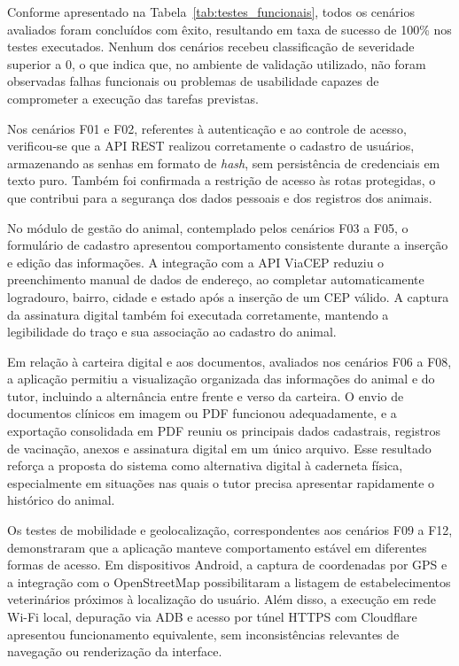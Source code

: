 Conforme apresentado na Tabela~\ref{tab:testes_funcionais}, todos os cenários avaliados foram concluídos com êxito, resultando em taxa de sucesso de 100\% nos testes executados. Nenhum dos cenários recebeu classificação de severidade superior a 0, o que indica que, no ambiente de validação utilizado, não foram observadas falhas funcionais ou problemas de usabilidade capazes de comprometer a execução das tarefas previstas.

Nos cenários F01 e F02, referentes à autenticação e ao controle de acesso, verificou-se que a API REST realizou corretamente o cadastro de usuários, armazenando as senhas em formato de \textit{hash}, sem persistência de credenciais em texto puro. Também foi confirmada a restrição de acesso às rotas protegidas, o que contribui para a segurança dos dados pessoais e dos registros dos animais.

No módulo de gestão do animal, contemplado pelos cenários F03 a F05, o formulário de cadastro apresentou comportamento consistente durante a inserção e edição das informações. A integração com a API ViaCEP reduziu o preenchimento manual de dados de endereço, ao completar automaticamente logradouro, bairro, cidade e estado após a inserção de um CEP válido. A captura da assinatura digital também foi executada corretamente, mantendo a legibilidade do traço e sua associação ao cadastro do animal.

Em relação à carteira digital e aos documentos, avaliados nos cenários F06 a F08, a aplicação permitiu a visualização organizada das informações do animal e do tutor, incluindo a alternância entre frente e verso da carteira. O envio de documentos clínicos em imagem ou PDF funcionou adequadamente, e a exportação consolidada em PDF reuniu os principais dados cadastrais, registros de vacinação, anexos e assinatura digital em um único arquivo. Esse resultado reforça a proposta do sistema como alternativa digital à caderneta física, especialmente em situações nas quais o tutor precisa apresentar rapidamente o histórico do animal.

Os testes de mobilidade e geolocalização, correspondentes aos cenários F09 a F12, demonstraram que a aplicação manteve comportamento estável em diferentes formas de acesso. Em dispositivos Android, a captura de coordenadas por GPS e a integração com o OpenStreetMap possibilitaram a listagem de estabelecimentos veterinários próximos à localização do usuário. Além disso, a execução em rede Wi-Fi local, depuração via ADB e acesso por túnel HTTPS com Cloudflare apresentou funcionamento equivalente, sem inconsistências relevantes de navegação ou renderização da interface.

